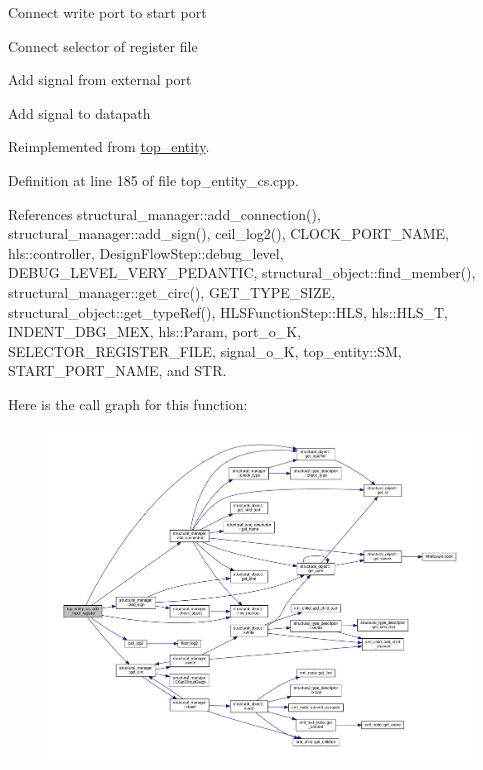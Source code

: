 Connect write port to start port

Connect selector of register file

Add signal from external port

Add signal to datapath 

Reimplemented from \hyperlink{classtop__entity_ad1949a318419093124c6a05b5823d0b2}{top\+\_\+entity}.



Definition at line 185 of file top\+\_\+entity\+\_\+cs.\+cpp.



References structural\+\_\+manager\+::add\+\_\+connection(), structural\+\_\+manager\+::add\+\_\+sign(), ceil\+\_\+log2(), C\+L\+O\+C\+K\+\_\+\+P\+O\+R\+T\+\_\+\+N\+A\+ME, hls\+::controller, Design\+Flow\+Step\+::debug\+\_\+level, D\+E\+B\+U\+G\+\_\+\+L\+E\+V\+E\+L\+\_\+\+V\+E\+R\+Y\+\_\+\+P\+E\+D\+A\+N\+T\+IC, structural\+\_\+object\+::find\+\_\+member(), structural\+\_\+manager\+::get\+\_\+circ(), G\+E\+T\+\_\+\+T\+Y\+P\+E\+\_\+\+S\+I\+ZE, structural\+\_\+object\+::get\+\_\+type\+Ref(), H\+L\+S\+Function\+Step\+::\+H\+LS, hls\+::\+H\+L\+S\+\_\+T, I\+N\+D\+E\+N\+T\+\_\+\+D\+B\+G\+\_\+\+M\+EX, hls\+::\+Param, port\+\_\+o\+\_\+K, S\+E\+L\+E\+C\+T\+O\+R\+\_\+\+R\+E\+G\+I\+S\+T\+E\+R\+\_\+\+F\+I\+LE, signal\+\_\+o\+\_\+K, top\+\_\+entity\+::\+SM, S\+T\+A\+R\+T\+\_\+\+P\+O\+R\+T\+\_\+\+N\+A\+ME, and S\+TR.

Here is the call graph for this function\+:
\nopagebreak
\begin{figure}[H]
\begin{center}
\leavevmode
\includegraphics[width=350pt]{d5/d78/classtop__entity__cs_a290fda5dd0c19322fd858606b5706aec_cgraph}
\end{center}
\end{figure}
\mbox{\label{classtop__entity__cs_a5d81c98939f48e4bdd7fe81f651000a2}} 
